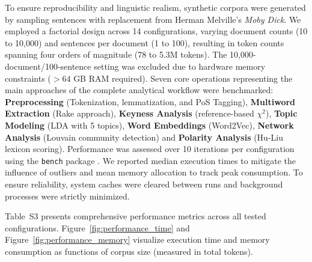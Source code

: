 \documentclass[8pt,a4paper]{article}
\begin{document}
To ensure reproducibility and linguistic realism, synthetic corpora were generated by sampling sentences with replacement from Herman Melville's \textit{Moby Dick}. We employed a factorial design across 14 configurations, varying document counts (10 to 10,000) and sentences per document (1 to 100), resulting in token counts spanning four orders of magnitude (78 to 5.3M tokens). The 10,000-document/100-sentence setting was excluded due to hardware memory constraints ($>64$ GB RAM required). Seven core operations representing the main approaches of the complete analytical workflow were benchmarked: \textbf{Preprocessing} (Tokenization, lemmatization, and PoS Tagging), \textbf{Multiword Extraction} (Rake approach), \textbf{Keyness Analysis} (reference-based $\chi^2$), \textbf{Topic Modeling} (LDA with 5 topics), \textbf{Word Embeddings} (Word2Vec), \textbf{Network Analysis} (Louvain community detection) and \textbf{Polarity Analysis} (Hu-Liu lexicon scoring). Performance was assessed over 10 iterations per configuration using the \texttt{bench} package \cite{bench25}. We reported median execution times to mitigate the influence of outliers and mean memory allocation to track peak consumption. To ensure reliability, system caches were cleared between runs and background processes were strictly minimized.

Table~S3 presents comprehensive performance metrics across all tested configurations. Figure~\ref{fig:performance_time} and Figure~\ref{fig:performance_memory} visualize execution time and memory consumption as functions of corpus size (measured in total tokens).
\end{document}
